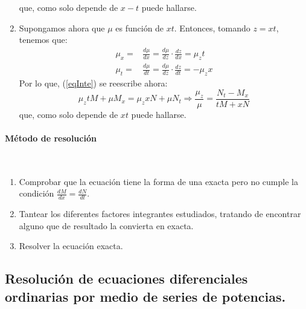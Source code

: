 \documentclass[11pt]{article}
\theoremstyle{theorem-style}  %
\theoremstyle{definition-style}
\theoremstyle{example-style}
\begin{document}
\begin{enumerate}
	que, como solo depende de $x-t$ puede hallarse.
	\item Supongamos ahora que $\mu$ es función de $xt$. Entonces, tomando $z=xt$, tenemos que:
	\begin{align*}
	\mu_x = & \frac{d\mu}{dx} = \frac{d\mu}{dz} \cdot \frac{dz}{dx} = \mu_zt \\
	\mu_t = & \frac{d\mu}{dt} = \frac{d\mu}{dz} \cdot \frac{dz}{dt} = -\mu_zx 
	\end{align*}
	Por lo que, (\ref{eqInte}) se reescribe ahora:
	\[\mu_z tM + \mu M_x = \mu_z xN + \mu N_t \Rightarrow \frac{\mu_z}{\mu} = \frac{N_t - M_x}{tM + xN}\]
	que, como solo depende de $xt$ puede hallarse.
\end{enumerate}

\paragraph{Método de resolución} \ 
\begin{enumerate}
	\item Comprobar que la ecuación tiene la forma de una exacta pero no cumple la condición  $\frac{dM}{dx} = \frac{dN}{dt}$.
	\item Tantear los diferentes factores integrantes estudiados, tratando de encontrar alguno que de resultado la convierta en exacta.
	\item Resolver la ecuación exacta.
\end{enumerate}

\subsection{Resolución de ecuaciones diferenciales ordinarias por medio de series de potencias.}

\pagebreak
\end{document}
